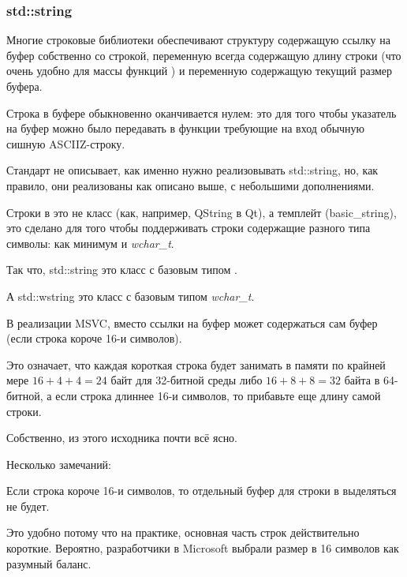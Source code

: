 \subsubsection{std::string}
\label{std_string}


Многие строковые библиотеки  обеспечивают структуру содержащую ссылку 
на буфер собственно со строкой, переменную всегда содержащую длину строки 
(что очень удобно для массы функций ) и переменную содержащую текущий размер буфера.

Строка в буфере обыкновенно оканчивается нулем: это для того чтобы указатель на буфер можно было
передавать в функции требующие на вход обычную сишную \ac{ASCIIZ}-строку.

Стандарт \Cpp не описывает, как именно нужно реализовывать std::string,
но, как правило, они реализованы как описано выше, с небольшими дополнениями.

Строки в \Cpp это не класс (как, например, QString в Qt), а темплейт (basic\_string), 
это сделано для того чтобы поддерживать 
строки содержащие разного типа символы: как минимум \Tchar и \emph{wchar\_t}.

Так что, std::string это класс с базовым типом \Tchar.

А std::wstring это класс с базовым типом \emph{wchar\_t}.


В реализации MSVC, вместо ссылки на буфер может содержаться сам буфер (если строка короче 16-и символов).

Это означает, что каждая короткая строка будет занимать в памяти по крайней мере $16 + 4 + 4 = 24$ 
байт для 32-битной среды либо $16 + 8 + 8 = 32$ 
байта в 64-битной, а если строка длиннее 16-и символов, то прибавьте еще длину самой строки.



Собственно, из этого исходника почти всё ясно.

Несколько замечаний:

Если строка короче 16-и символов, 
то отдельный буфер для строки в  выделяться не будет.

Это удобно потому что на практике, основная часть строк действительно короткие.
Вероятно, разработчики в Microsoft выбрали размер в 16 символов как разумный баланс.

